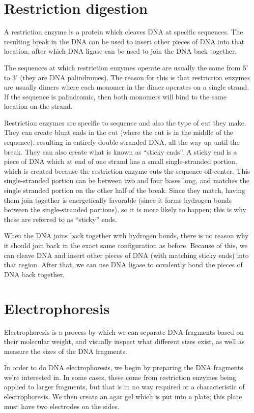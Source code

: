 \documentclass{article}
\begin{document}
\section*{Restriction digestion}
A restriction enzyme is a protein which cleaves DNA at specific sequences. The resulting break in
the DNA can be used to insert other pieces of DNA into that location, after which DNA ligase can be
used to join the DNA back together.

The sequences at which restriction enzymes operate are usually the same from 5' to 3' (they are DNA
palindromes). The reason for this is that restriction enzymes are usually dimers where each monomer
in the dimer operates on a single strand. If the sequence is palindromic, then both monomers will
bind to the same location on the strand.

Restriction enzymes are specific to sequence and also the type of cut they make. They can create
blunt ends in the cut (where the cut is in the middle of the sequence), resulting in entirely double
stranded DNA, all the way up until the break. They can also create what is known as ``sticky ends''.
A sticky end is a piece of DNA which at end of one strand has a small single-stranded portion, which
is created because the restriction enzyme cuts the sequence off-center. This single-stranded portion
can be between two and four bases long, and matches the single stranded portion on the other half of
the break. Since they match, having them join together is energetically favorable (since it forms
hydrogen bonds between the single-stranded portions), so it is more likely to happen; this is why
these are referred to as ``sticky'' ends.

When the DNA joins back together with hydrogen bonds, there is no reason why it should join back in
the exact same configuration as before. Because of this, we can cleave DNA and insert other pieces
of DNA (with matching sticky ends) into that region. After that, we can use DNA ligase to covalently
bond the pieces of DNA back together.

\section*{Electrophoresis}
Electrophoresis is a process by which we can separate DNA fragments based on their molecular weight,
and visually inspect what different sizes exist, as well as measure the sizes of the DNA fragments.

In order to do DNA electrophoresis, we begin by preparing the DNA fragments we're interested in. In
some cases, these come from restriction enzymes being applied to larger fragments, but that is in no
way required or a characteristic of electrophoresis. We then create an agar gel which is put into a
plate; this plate must have two electrodes on the sides.
\end{document}
